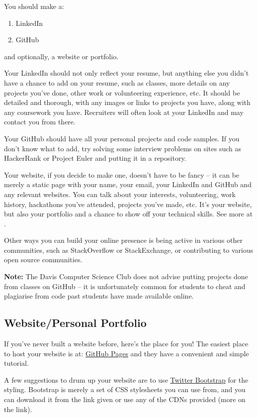 \documentclass{article}
\begin{document}
You should make a: 
\begin{enumerate}
    \item LinkedIn
    \item GitHub
\end{enumerate}

and optionally, a website or portfolio.

Your LinkedIn should not only reflect your resume, but anything else you didn't
have a chance to add on your resume, such as classes, more details on any
projects you've done, other work or volunteering experience, etc. It should be
detailed and thorough, with any images or links to projects you have, along with
any coursework you have. Recruiters will often look at your LinkedIn and may
contact you from there.

Your GitHub should have all your personal projects and code samples. If you
don't know what to add, try solving some interview problems on sites such as
HackerRank or Project Euler and putting it in a repository.

Your website, if you decide to make one, doesn't have to be fancy -- it can be
merely a static page with your name, your email, your LinkedIn and GitHub and
any relevant websites. You can talk about your interests, volunteering, work
history, hackathons you've attended, projects you've made, etc. It's your
website, but also your portfolio and a chance to show off your technical
skills. See more at .

Other ways you can build your online presence is being active in various other
communities, such as StackOverflow or StackExchange, or contributing to various
open source communities.

\textbf{Note:} The Davis Computer Science Club does not advise putting projects
done from classes on GitHub -- it is unfortunately common for students to
cheat and plagiarise from code past students have made available online.
\subsection {Website/Personal Portfolio}
\label{sec:website}
If you've never built a website before, here's the place for you! The easiest
place to host your website is at: \href{https://pages.github.com/}{GitHub Pages}
and they have a convenient and simple tutorial.

A few suggestions to drum up your website are to use
\href{http://getbootstrap.com/2.3.2/}{Twitter Bootstrap} for the
styling. Bootstrap is merely a set of CSS stylesheets you can use from, and you
can download it from the link given or use any of the CDNs provided (more on the
link).
\end{document}
